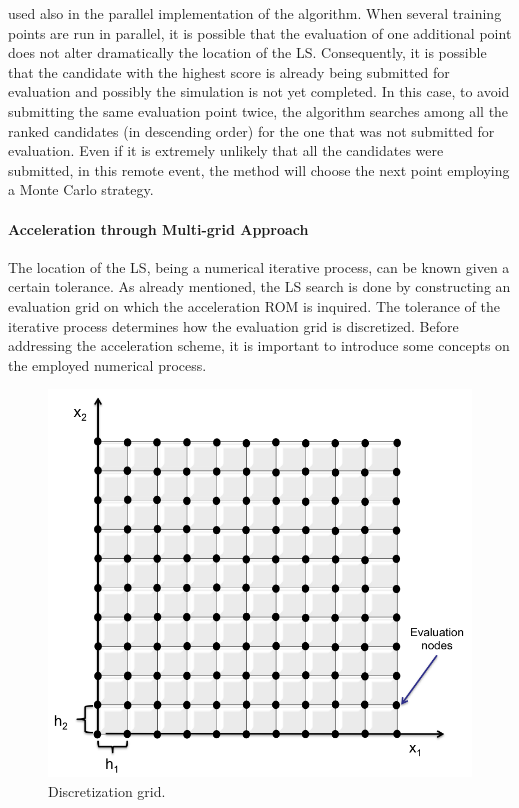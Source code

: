 used also in the parallel implementation of the algorithm. When
several training points are run in parallel, it is possible that the
evaluation of one additional point does not alter dramatically the
location of the LS. Consequently, it is possible that the candidate with
the highest score is already being submitted for evaluation and
possibly the simulation is not yet completed. In this case, to avoid
submitting the same evaluation point twice, the algorithm searches
among all the ranked candidates (in descending order) for the one
that was not submitted for evaluation. Even if it is extremely unlikely
that all the candidates were submitted, in this remote event, the
method will choose the next point employing a Monte Carlo strategy.
\paragraph{Acceleration through Multi-grid Approach}
\label{par:LSaccelerationMultiGrid}
The location of the LS, being a numerical iterative process, can be
known given a certain tolerance. As already mentioned, the LS search
is done by constructing an evaluation grid on which the acceleration
ROM is inquired. The tolerance of the iterative process determines how
the evaluation grid is discretized. Before addressing the acceleration
scheme, it is important
to introduce some concepts on the employed numerical process.
\begin{figure}[h!]
  \centering
  \includegraphics[width=1.0\textwidth]  {pics/DiscretizationGrid.png}
  \caption{Discretization grid.}
  \label{fig:DiscretizationGrid}
\end{figure}
